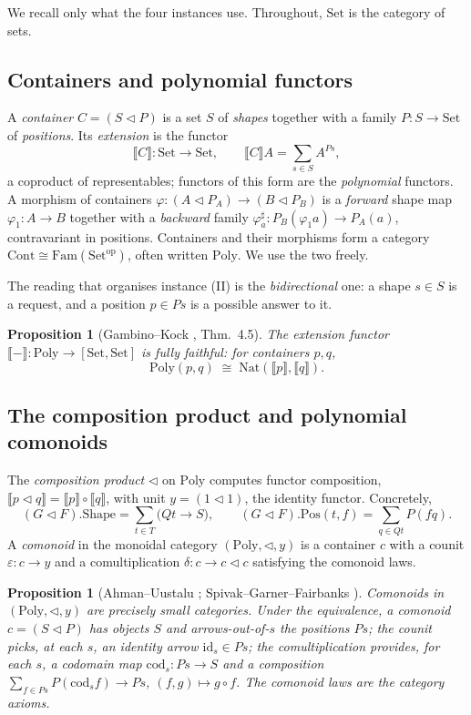 \documentclass[11pt,reqno]{amsart}
\theoremstyle{plain}
\newtheorem{proposition}[theorem]{Proposition}
\theoremstyle{definition}
\newcommand{\Set}{\mathrm{Set}}
\newcommand{\Poly}{\mathrm{Poly}}
\newcommand{\Cont}{\mathrm{Cont}}
\newcommand{\Fam}{\mathrm{Fam}}
\newcommand{\cod}{\mathrm{cod}}
\newcommand{\id}{\mathrm{id}}
\newcommand{\sem}[1]{\llbracket #1 \rrbracket}
\newcommand{\cext}[1]{\sem{#1}}
\newcommand{\op}{\mathrm{op}}
\begin{document}
We recall only what the four instances use. Throughout, $\Set$ is the category of sets.

\subsection{Containers and polynomial functors}
A \emph{container} $C = (S \triangleleft P)$ is a set $S$ of \emph{shapes} together with a family
$P : S \to \Set$ of \emph{positions}. Its \emph{extension} is the functor
\[
  \cext{C} : \Set \to \Set, \qquad \cext{C} A = \sum_{s \in S} A^{P s},
\]
a coproduct of representables; functors of this form are the \emph{polynomial} functors. A morphism of
containers $\varphi : (A \triangleleft P_A) \to (B \triangleleft P_B)$ is a \emph{forward} shape map
$\varphi_1 : A \to B$ together with a \emph{backward} family
$\varphi^\sharp_a : P_B(\varphi_1 a) \to P_A(a)$, contravariant in positions. Containers and their
morphisms form a category $\Cont \cong \Fam(\Set^{\op})$, often written $\Poly$. We use the two freely.

The reading that organises instance (II) is the \emph{bidirectional} one: a shape $s \in S$ is a
request, and a position $p \in P s$ is a possible answer to it.

\begin{proposition}[Gambino--Kock \cite{GambinoKock2013}, Thm.~4.5]\label{prop:ff}
The extension functor $\cext{-} : \Poly \to [\Set,\Set]$ is fully faithful: for containers $p,q$,
\[
  \Poly(p,q) \;\cong\; \mathrm{Nat}(\cext{p},\cext{q}).
\]
\end{proposition}

\subsection{The composition product and polynomial comonoids}
The \emph{composition product} $\triangleleft$ on $\Poly$ computes functor composition,
$\cext{p \triangleleft q} = \cext{p} \circ \cext{q}$, with unit $y = (1 \triangleleft 1)$, the identity
functor. Concretely,
\[
  (G \triangleleft F).\mathrm{Shape} = \sum_{t \in T}\big(Q t \to S\big), \qquad
  (G \triangleleft F).\mathrm{Pos}(t,f) = \sum_{q \in Q t} P(f q).
\]
A \emph{comonoid} in the monoidal category $(\Poly, \triangleleft, y)$ is a container $c$ with a counit
$\varepsilon : c \to y$ and a comultiplication $\delta : c \to c \triangleleft c$ satisfying the
comonoid laws.

\begin{proposition}[Ahman--Uustalu \cite{AhmanUustalu2016}; Spivak--Garner--Fairbanks
\cite{SpivakGarnerFairbanks2025}]\label{prop:comonoid-cat}
Comonoids in $(\Poly,\triangleleft,y)$ are precisely small categories. Under the equivalence, a comonoid
$c = (S \triangleleft P)$ has objects $S$ and arrows-out-of-$s$ the positions $P s$; the counit picks, at
each $s$, an identity arrow $\id_s \in P s$; the comultiplication provides, for each $s$, a codomain map
$\cod_s : P s \to S$ and a composition $\sum_{f \in P s} P(\cod_s f) \to P s$, $(f,g) \mapsto g \circ f$.
The comonoid laws are the category axioms.
\end{proposition}
\end{document}
